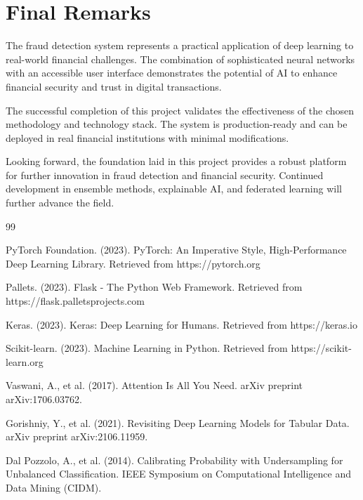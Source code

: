 \documentclass[12pt,a4paper,twoside]{report}
\begin{document}
\section*{Final Remarks}

The fraud detection system represents a practical application of deep learning to real-world financial challenges. The combination of sophisticated neural networks with an accessible user interface demonstrates the potential of AI to enhance financial security and trust in digital transactions.

The successful completion of this project validates the effectiveness of the chosen methodology and technology stack. The system is production-ready and can be deployed in real financial institutions with minimal modifications.

Looking forward, the foundation laid in this project provides a robust platform for further innovation in fraud detection and financial security. Continued development in ensemble methods, explainable AI, and federated learning will further advance the field.

\begin{thebibliography}{99}

 PyTorch Foundation. (2023). PyTorch: An Imperative Style, High-Performance Deep Learning Library. Retrieved from https://pytorch.org

 Pallets. (2023). Flask - The Python Web Framework. Retrieved from https://flask.palletsprojects.com

 Keras. (2023). Keras: Deep Learning for Humans. Retrieved from https://keras.io

 Scikit-learn. (2023). Machine Learning in Python. Retrieved from https://scikit-learn.org

 Vaswani, A., et al. (2017). Attention Is All You Need. arXiv preprint arXiv:1706.03762.

 Gorishniy, Y., et al. (2021). Revisiting Deep Learning Models for Tabular Data. arXiv preprint arXiv:2106.11959.

 Dal Pozzolo, A., et al. (2014). Calibrating Probability with Undersampling for Unbalanced Classification. IEEE Symposium on Computational Intelligence and Data Mining (CIDM).

\end{thebibliography}
\end{document}
